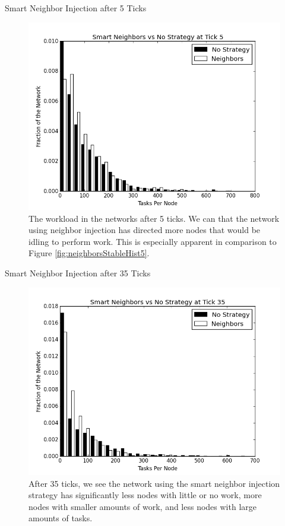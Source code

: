 \documentclass[11pt]{beamer}
\begin{document}
\begin{frame}{Smart Neighbor Injection after 5 Ticks}
\begin{figure}
	\centering
	\includegraphics[width=0.7\linewidth]{figs/neighborsStableSmartHist5}
	\caption[Smart neighbor injection vs no strategy after 5 ticks.]{The workload in the networks after 5 ticks. We can that the network using neighbor injection has directed more nodes that would be idling to perform work.  This is especially apparent in comparison to Figure \ref{fig:neighborsStableHist5}.}
	\label{fig:neighborsStableSmartHist5}
\end{figure}
\end{frame}


\begin{frame}{Smart Neighbor Injection after 35 Ticks}
\begin{figure}
	\centering
	\includegraphics[width=0.7\linewidth]{figs/neighborsStableSmartHist35}
	\caption[Smart Neighbor injection  vs no strategy after 35 ticks.]{After 35 ticks, we see the network using the smart neighbor injection strategy has significantly less nodes with little or no work, more nodes with smaller amounts of work, and less nodes with large amounts of tasks.}
	\label{fig:neighborsStableSmartHist35}
\end{figure}
\end{frame}
\end{document}

